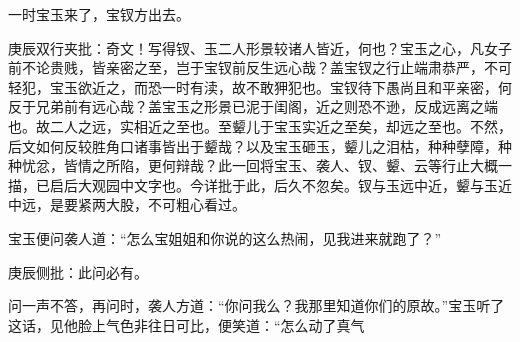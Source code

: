 \begin{parag}


    一时宝玉来了，宝钗方出去。\begin{note}庚辰双行夹批：奇文！写得钗、玉二人形景较诸人皆近，何也？宝玉之心，凡女子前不论贵贱，皆亲密之至，岂于宝钗前反生远心哉？盖宝钗之行止端肃恭严，不可轻犯，宝玉欲近之，而恐一时有渎，故不敢狎犯也。宝钗待下愚尚且和平亲密，何反于兄弟前有远心哉？盖宝玉之形景已泥于闺阁，近之则恐不逊，反成远离之端也。故二人之远，实相近之至也。至颦儿于宝玉实近之至矣，却远之至也。不然，后文如何反较胜角口诸事皆出于颦哉？以及宝玉砸玉，颦儿之泪枯，种种孽障，种种忧忿，皆情之所陷，更何辩哉？此一回将宝玉、袭人、钗、颦、云等行止大概一描，已启后大观园中文字也。今详批于此，后久不忽矣。钗与玉远中近，颦与玉近中远，是要紧两大股，不可粗心看过。\end{note}宝玉便问袭人道：“怎么宝姐姐和你说的这么热闹，见我进来就跑了？”\begin{note}庚辰侧批：此问必有。\end{note}问一声不答，再问时，袭人方道：“你问我么？我那里知道你们的原故。”宝玉听了这话，见他脸上气色非往日可比，便笑道：“怎么动了真气
\end{parag}
